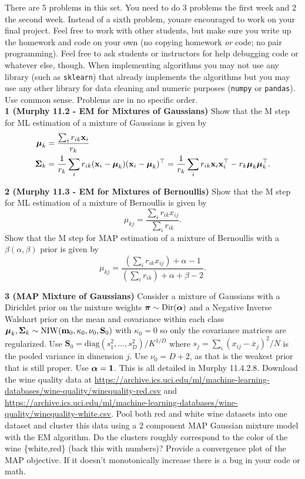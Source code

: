 \documentclass[12pt,letterpaper,fleqn]{hmcpset}
\begin{document}
There are 5 problems in this set. You need to do 3 problems the first week and 2 the second
week. Instead of a sixth problem, youare encouraged to work on your final project.
Feel free to work with other students, but make sure you write up the homework
and code on your own (no copying homework \textit{or} code; no pair programming).
Feel free to ask students or instructors for help debugging code or whatever else,
though.
When implementing algorithms you may not use any library (such as \texttt{sklearn})
that already implements the algorithms but you may use any other library for
data cleaning and numeric purposes (\texttt{numpy} or \texttt{pandas}). Use common
sense. Problems are in no specific order.\\[1em]

\textbf{1 (Murphy 11.2 - EM for Mixtures of Gaussians)} Show that the M step for ML
estimation of a mixture of Gaussians is given by
\begin{align*}
    \hbox{\boldmath$\mu$}_k &= \frac{\sum_i r_{ik}{\bf x}_i}{r_k}\\
    \hbox{\boldmath$\Sigma$}_k &= \frac{1}{r_k}\sum_i r_{ik}({\bf x}_i - \hbox{\boldmath$\mu$}_k)({\bf x}_i - \hbox{\boldmath$\mu$}_k)^\top = \frac{1}{r_k}\sum_i r_{ik}{\bf x}_i{\bf x}_i^\top - r_k\hbox{\boldmath$\mu$}_k\hbox{\boldmath$\mu$}_k^\top.
\end{align*}

\textbf{2 (Murphy 11.3 - EM for Mixtures of Bernoullis)} Show that the M step for ML estimation
of a mixture of Bernoullis is given by
\[
    \mu_{kj} = \frac{\sum_i r_{ik}x_{ij}}{\sum_i r_{ik}}.
\]
Show that the M step for MAP estimation of a mixture of Bernoullis with a $\beta(\alpha,\beta)$ prior
is given by
\[
    \mu_{kj} = \frac{\left(\sum_i r_{ik}x_{ij}\right) + \alpha - 1}{\left(\sum_i r_{ik}\right) + \alpha + \beta - 2}.
\]

\textbf{3 (MAP Mixture of Gaussians)} Consider a mixture of Gaussians with a Dirichlet prior on the
mixture weights $\hbox{\boldmath$\pi$} \sim \mathrm{Dir}(\hbox{\boldmath$\alpha$})$ and a Negative Inverse Walshart prior on the
mean and covariance within each class
$\hbox{\boldmath$\mu$}_k,\hbox{\boldmath$\Sigma$}_k \sim \mathrm{NIW}(\mathbf{m}_0,\kappa_0,\nu_0,\mathbf{S}_0)$ with $\kappa_0=0$ so
only the covariance matrices are regularized. Use $\mathbf{S}_0 = \mathrm{diag}(s_1^2,\dots,s_D^2)/K^{1/D}$
where $s_j = \sum_i(x_{ij} - \overline{x}_j)^2/N$ is the pooled variance in dimension $j$. Use $\nu_0 = D + 2$,
as that is the weakest prior that is still proper. Use $\hbox{\boldmath$\alpha$} = {\bf 1}$. This is all detailed in Murphy 11.4.2.8. Download the
wine quality data at \url{https://archive.ics.uci.edu/ml/machine-learning-databases/wine-quality/winequality-red.csv}
and \url{https://archive.ics.uci.edu/ml/machine-learning-databases/wine-quality/winequality-white.csv}. Pool both
red and white wine datasets into one dataset and cluster this data using a 2 component MAP Gaussian mixture model
with the EM algorithm. Do the clusters roughly correspond to the color of the wine \{white,red\} (back this with
numbers)? Provide a convergence plot of the MAP objective. If it doesn't monotonically increase there is a bug
in your code or math.
\end{document}
